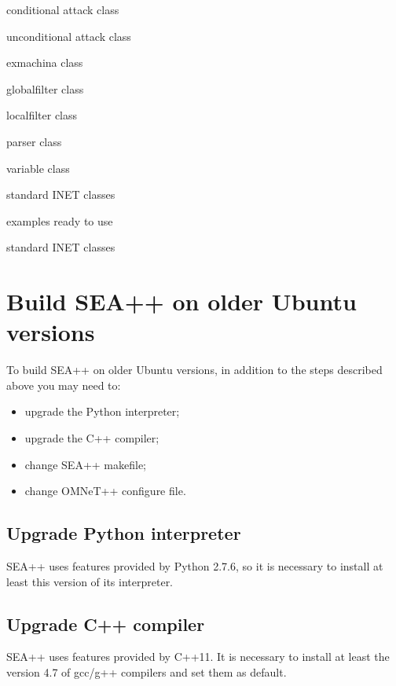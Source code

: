 \begin{description}[noitemsep]
			\item[] { conditional attack class}
			\item[] { unconditional attack class}
		\item[] { exmachina class}
		\item[] { globalfilter class}
		\item[] { localfilter class}
		\item[] { parser class}
		\item[] { variable class}
		\item[] { standard INET classes}
	\item[] { examples ready to use}
	\item[] { standard INET classes}
\end{description}



\section{Build SEA++ on older Ubuntu versions}
To build SEA++ on older Ubuntu versions, in addition to the steps described above you may need to:
%
\begin{itemize}
\item upgrade the Python interpreter;
\item upgrade the C++ compiler;
\item change SEA++ makefile;
\item change OMNeT++ configure file.
\end{itemize}

\subsection{Upgrade Python interpreter}
SEA++ uses features provided by Python 2.7.6, so it is necessary to install at least this version of its interpreter.

\subsection{Upgrade C++ compiler}
SEA++ uses features provided by C++11. It is necessary to install at least the version 4.7 of gcc/g++ compilers and set them as default.


